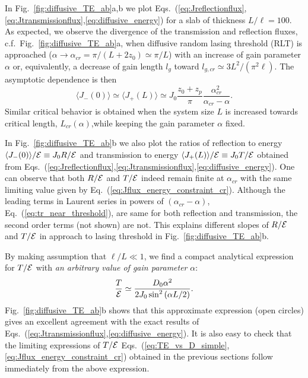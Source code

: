 In Fig.~\ref{fig:diffusive_TE_ab}a,b we plot Eqs.~(\ref{eq:Jreflectionflux},\ref{eq:Jtransmissionflux},\ref{eq:diffusive_energy}) for a slab of thickness $L/\ell=100$. As expected, we observe the divergence of the transmission and reflection fluxes, c.f.~Fig.~\ref{fig:diffusive_TE_ab}a, when diffusive random lasing threshold (RLT) is approached ($\alpha\rightarrow\alpha_{cr}=\pi/(L+2z_0)\simeq \pi/L$) with an increase of gain parameter $\alpha$ or, equivalently, a decrease of gain length $l_g$ toward $l_{g,cr}\simeq 3L^2/(\pi^2\ell)$. The asymptotic dependence is then
\begin{equation}
\langle J_- (0)\rangle \simeq \langle J_+ (L)\rangle \simeq J_0\frac{z_0 +
z_p}{\pi} \frac{\alpha_{cr} ^2}{\alpha_{cr} -\alpha}.
\label{eq:tr_near_threshold}
\end{equation}
Similar critical behavior is obtained when the system size $L$ is increased towards critical length, $L_{cr}(\alpha)$,while keeping the gain parameter $\alpha$ fixed.

In Fig.~\ref{fig:diffusive_TE_ab}b we also plot the ratios of reflection to energy $\langle J_- (0)\rangle /{\cal E}\equiv J_0R/{\cal E}$ and transmission to energy $\langle J_+ (L)\rangle /{\cal E}\equiv J_0T/{\cal E}$ obtained from Eqs.~(\ref{eq:Jreflectionflux},\ref{eq:Jtransmissionflux},\ref{eq:diffusive_energy}). One can observe that both $R/{\cal E}$ and $T/{\cal E}$ indeed remain finite at $\alpha_{cr}$ with the same limiting value given by Eq.~(\ref{eq:Jflux_energy_constraint_cr}). Although the leading terms in Laurent series in powers of $(\alpha_{cr} -\alpha )$, Eq.~(\ref{eq:tr_near_threshold}), are same for both reflection and transmission, the second order terms (not shown) are not. This explains different slopes of $R/{\cal E}$ and $T/{\cal E}$ in approach to lasing threshold in Fig.~\ref{fig:diffusive_TE_ab}b.

By making assumption that $\ell/L\ll 1$, we find a compact analytical expression for $T/{\cal E}$ with {\it an arbitrary value of gain parameter} $\alpha$: 
\begin{equation}
\frac{T}{{\cal E}} \simeq \displaystyle\frac{D_0\alpha^2}{2J_0\sin^2\left(\alpha L/2\right)}.
\label{eq:TE_analytical}
\end{equation}
Fig.~\ref{fig:diffusive_TE_ab}b shows that this approximate expression (open circles) gives an excellent agreement with the exact results of Eqs.~(\ref{eq:Jtransmissionflux},\ref{eq:diffusive_energy}). It is also easy to check that the limiting expressions of $T/{\cal E}$ Eqs.~(\ref{eq:TE_vs_D_simple},\ref{eq:Jflux_energy_constraint_cr}) obtained in the previous sections follow immediately from the above expression.

